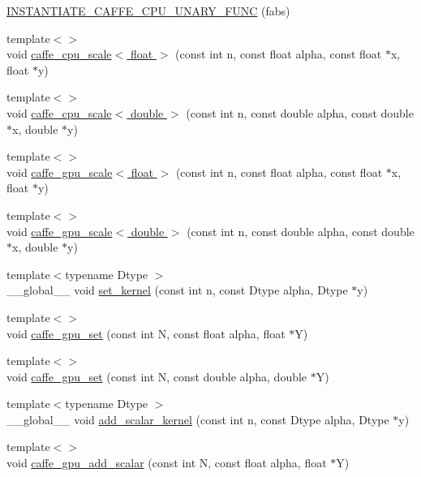 \begin{DoxyCompactItemize}
\item 
\hyperlink{namespacecaffe_af148f93b7fe34420cb99378cd2fac632}{I\+N\+S\+T\+A\+N\+T\+I\+A\+T\+E\+\_\+\+C\+A\+F\+F\+E\+\_\+\+C\+P\+U\+\_\+\+U\+N\+A\+R\+Y\+\_\+\+F\+U\+N\+C} (fabs)
\item 
{\footnotesize template$<$$>$ }\\void \hyperlink{namespacecaffe_a8652e05695145f9dfd4304117106a8f6}{caffe\+\_\+cpu\+\_\+scale$<$ float $>$} (const int n, const float alpha, const float $\ast$x, float $\ast$y)
\item 
{\footnotesize template$<$$>$ }\\void \hyperlink{namespacecaffe_a104637443c3bd34c155a32bd29bb9150}{caffe\+\_\+cpu\+\_\+scale$<$ double $>$} (const int n, const double alpha, const double $\ast$x, double $\ast$y)
\item 
{\footnotesize template$<$$>$ }\\void \hyperlink{namespacecaffe_ad76f5c3482ec1dcf1efbb52e16f5c1ae}{caffe\+\_\+gpu\+\_\+scale$<$ float $>$} (const int n, const float alpha, const float $\ast$x, float $\ast$y)
\item 
{\footnotesize template$<$$>$ }\\void \hyperlink{namespacecaffe_a4c9116a75a01dc2822896595e6356fbc}{caffe\+\_\+gpu\+\_\+scale$<$ double $>$} (const int n, const double alpha, const double $\ast$x, double $\ast$y)
\item 
{\footnotesize template$<$typename Dtype $>$ }\\\+\_\+\+\_\+global\+\_\+\+\_\+ void \hyperlink{namespacecaffe_ae97b58df87eb89d1ec96c2a016e90ced}{set\+\_\+kernel} (const int n, const Dtype alpha, Dtype $\ast$y)
\item 
{\footnotesize template$<$$>$ }\\void \hyperlink{namespacecaffe_a298e3ff433dffce569a6150a4bbea6c6}{caffe\+\_\+gpu\+\_\+set} (const int N, const float alpha, float $\ast$Y)
\item 
{\footnotesize template$<$$>$ }\\void \hyperlink{namespacecaffe_a4156ed130860020848421280104678ab}{caffe\+\_\+gpu\+\_\+set} (const int N, const double alpha, double $\ast$Y)
\item 
{\footnotesize template$<$typename Dtype $>$ }\\\+\_\+\+\_\+global\+\_\+\+\_\+ void \hyperlink{namespacecaffe_a732b4e5823cbeb18b654845a8e0562d5}{add\+\_\+scalar\+\_\+kernel} (const int n, const Dtype alpha, Dtype $\ast$y)
\item 
{\footnotesize template$<$$>$ }\\void \hyperlink{namespacecaffe_ad867b51206d97a333d76d4e1390a7fa3}{caffe\+\_\+gpu\+\_\+add\+\_\+scalar} (const int N, const float alpha, float $\ast$Y)

\end{DoxyCompactItemize}
